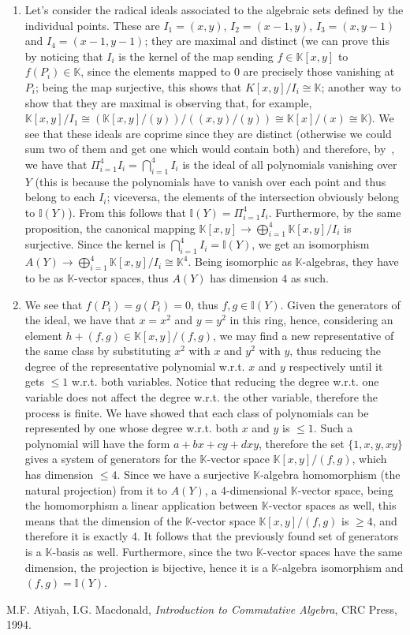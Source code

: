 \documentclass{article}
\newcommand{\numberset}{\mathbb}
\newcommand{\K}{\numberset{K}}
\newcommand{\I}{\mathbb{I}}
\newcommand{\exercise}[1]{\noindent {\bf Exercise #1}}
\begin{document}
\exercise{2.5.8}

\begin{enumerate}
		\item Let's consider the radical ideals associated to the algebraic sets defined by the individual points. These are $I_1=(x,y)$, $I_2=(x-1,y)$, $I_3=(x,y-1)$ and $I_4=(x-1,y-1)$; they are maximal and distinct (we can prove this by noticing that $I_i$ is the kernel of the map sending $f\in\K[x,y]$ to $f(P_i)\in\K$, since the elements mapped to $0$ are precisely those vanishing at $P_i$; being the map surjective, this shows that $K[x,y]/I_i\cong\K$; another way to show that they are maximal is observing that, for example, $\K[x,y]/I_1\cong(\K[x,y]/(y))/((x,y)/(y))\cong\K[x]/(x)\cong\K$).
				We see that these ideals are coprime since they are distinct (otherwise we could sum two of them and get one which would contain both) and therefore, by~\cite[prop. 1.10]{atm}, we have that $\Pi_{i=1}^4 I_i=\bigcap_{i=1}^4 I_i$ is the ideal of all polynomials vanishing over $Y$ (this is because the polynomials have to vanish over each point and thus belong to each $I_i$; viceversa, the elements of the intersection obviously belong to $\I(Y)$).
			From this follows that $\I(Y)=\Pi_{i=1}^4 I_i$.
			Furthermore, by the same proposition, the canonical mapping $\K[x,y]\rightarrow\bigoplus^4_{i=1}\K[x,y]/I_i$ is surjective. Since the kernel is $\bigcap_{i=1}^4 I_i=\I(Y)$, we get an isomorphism $A(Y)\rightarrow\bigoplus^4_{i=1}\K[x,y]/I_i\cong\K^4$.
			Being isomorphic as $\K$-algebras, they have to be as $\K$-vector spaces, thus $A(Y)$ has dimension $4$ as such.
		\item We see that $f(P_i)=g(P_i)=0$, thus $f,g\in\I(Y)$. Given the generators of the ideal, we have that $x=x^2$ and $y=y^2$ in this ring, hence, considering an element $h+(f,g)\in\K[x,y]/(f,g)$, we may find a new representative of the same class by substituting $x^2$ with $x$ and $y^2$ with $y$, thus reducing the degree of the representative polynomial w.r.t. $x$ and $y$ respectively until it gets $\leq 1$ w.r.t. both variables. Notice that reducing the degree w.r.t. one variable does not affect the degree w.r.t. the other variable, therefore the process is finite. We have showed that each class of polynomials can be represented by one whose degree w.r.t. both $x$ and $y$ is $\leq 1$.
			Such a polynomial will have the form $a+bx+cy+dxy$, therefore the set $\{1,x,y,xy\}$ gives a system of generators for the $\K$-vector space $\K[x,y]/(f,g)$, which has dimension $\leq 4$.
			Since we have a surjective $\K$-algebra homomorphism (the natural projection) from it to $A(Y)$, a 4-dimensional $\K$-vector space, being the homomorphism a linear application between $\K$-vector spaces as well, this means that the dimension of the $\K$-vector space $\K[x,y]/(f,g)$ is $\geq 4$, and therefore it is exactly 4. It follows that the previously found set of generators is a $\K$-basis as well. Furthermore, since the two $\K$-vector spaces have the same dimension, the projection is bijective, hence it is a $\K$-algebra isomorphism and $(f,g)=\I(Y)$.
\end{enumerate}

\begin{thebibliography}{9}
	M.F. Atiyah, I.G. Macdonald,
	\textit{Introduction to Commutative Algebra},
	CRC Press,
	1994.
\end{thebibliography}
\end{document}
